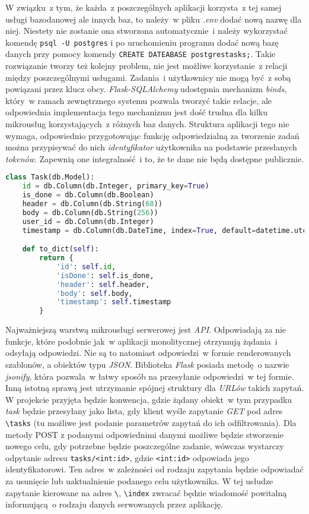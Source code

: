 W związku~z tym, że każda~z poszczególnych aplikacji korzysta~z tej samej usługi bazodanowej ale innych baz, to należy~w pliku \textit{.env} dodać nową nazwę dla niej. Niestety nie zostanie ona stworzona automatycznie~i należy wykorzystać komendę \verb|psql -U postgres| i po uruchomieniu programu dodać nową bazę danych przy pomocy komendy \verb|CREATE DATEABASE postgrestasks;|. Takie rozwiązanie tworzy też kolejny problem, nie jest możliwe korzystanie~z relacji między poszczególnymi usługami. Zadania~i użytkownicy nie mogą być~z sobą powiązani przez klucz obcy. \textit{Flask-SQLAlchemy} udostępnia mechanizm \textit{binds}, który~w ramach zewnętrznego systemu pozwala tworzyć takie relacje\cite{flasksql}, ale odpowiednia implementacja tego mechanizmu jest dość trudna dla kilku mikrousług korzystających~z różnych baz danych. Struktura aplikacji tego nie wymaga, odpowiednio przygotowując funkcję odpowiedzialną za tworzenie zadań można przypisywać do nich \textit{identyfikator} użytkownika na podstawie przesłanych \textit{tokenów}. Zapewnią one integralność~i to, że te dane nie będą dostępne publicznie.

\begin{lstlisting}[language=Python, caption={Model zadania w mikrousłudze \textit{tasks} wraz z metodą \textit{to\_dict}.}]
class Task(db.Model):
    id = db.Column(db.Integer, primary_key=True)
    is_done = db.Column(db.Boolean)
    header = db.Column(db.String(68))
    body = db.Column(db.String(256))
    user_id = db.Column(db.Integer)
    timestamp = db.Column(db.DateTime, index=True, default=datetime.utcnow)

    def to_dict(self):
        return {
            'id': self.id,
            'isDone': self.is_done,
            'header': self.header,
            'body': self.body,
            'timestamp': self.timestamp
        }
\end{lstlisting}

Najważniejszą warstwą mikrousługi serwerowej jest \textit{API}. Odpowiadają za nie funkcje, które podobnie jak~w aplikacji monolitycznej otrzymują żądania~i odsyłają odpowiedzi. Nie są to natomiast odpowiedzi~w formie renderowanych szablonów, a obiektów typu \textit{JSON}. Biblioteka \textit{Flask} posiada metodę~o nazwie \textit{jsonify}, która pozwala~w łatwy sposób na przesyłanie odpowiedzi~w tej formie. Inną istotną sprawą jest utrzymanie spójnej struktury dla \textit{URLów} takich zapytań. W projekcie przyjęta będzie konwencja, gdzie żądany obiekt~w tym przypadku \textit{task} będzie przesyłany jako lista, gdy klient wyśle zapytanie \textit{GET} pod adres \verb|\tasks| (tu możliwe jest podanie parametrów zapytań do ich odfiltrowania). Dla metody {POST} z podanymi odpowiednimi danymi możliwe będzie stworzenie nowego celu, gdy potrzebne będzie poszczególne zadanie, wówczas wystarczy odpytanie adresu \verb|tasks/<int:id>|, gdzie \verb|<int:id>| odpowiada jego identyfikatorowi. Ten adres~w zależności od rodzaju zapytania będzie odpowiadać za usunięcie lub uaktualnienie podanego celu użytkownika.
W tej usłudze zapytanie kierowane na adres \verb|\|, \verb|\index| zwracać będzie wiadomość powitalną informującą~o rodzaju danych serwowanych przez aplikację. 
  
